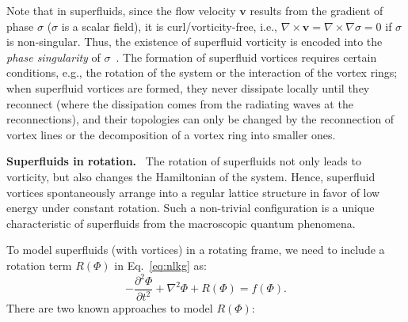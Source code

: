 \documentclass[10pt,journal,compsoc,twoside]{IEEEtran}
\begin{document}
	Note that in superfluids, since the flow velocity $\mathbf{v}$ results from the gradient of phase $\sigma$ ($\sigma$ is a scalar field), it is curl/vorticity-free, i.e., $\nabla\times \mathbf{v}=\nabla\times\nabla\sigma=0$ if $\sigma$ is non-singular.
	Thus, the existence of superfluid vorticity is encoded into the {\em phase singularity} of $\sigma$~\cite{Feynman-55,PRD_14}.
	The formation of superfluid vortices requires certain conditions, e.g., the rotation of the system or the interaction of the vortex rings; when superfluid vortices are formed, they never dissipate locally until they reconnect (where the dissipation comes from the radiating waves at the reconnections), and their topologies can only be changed by the reconnection of vortex lines or the decomposition of a vortex ring into smaller ones.
	
	\vspace{0.1cm}
	\noindent
	\textbf{Superfluids in rotation.} \
	The rotation of superfluids not only leads to vorticity, but also changes the Hamiltonian of the system.
	Hence, superfluid vortices spontaneously arrange into a regular lattice structure in favor of low energy under constant rotation.
	Such a non-trivial configuration is a unique characteristic of superfluids from the macroscopic quantum phenomena.
	
	To model superfluids (with vortices) in a rotating frame, we need to include a rotation term $R(\Phi)$ in Eq.~\ref{eq:nlkg} as:
	\begin{equation} \label{eq:nlkg_rotation}
		- \frac{\partial^2 \Phi}{\partial t^2} + \nabla^2 \Phi + R(\Phi) = f(\Phi).
	\end{equation}
	There are two known approaches to model $R(\Phi)$:
	
\end{document}
